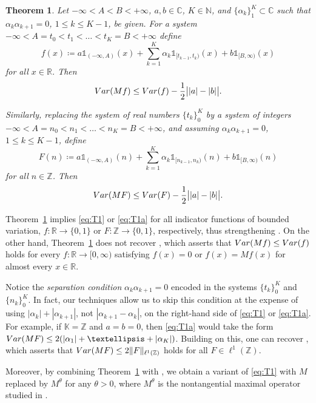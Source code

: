 \documentclass[leqno,11pt]{amsart}
\numberwithin{equation}{section}
\newtheorem{theorem}{Theorem}
\numberwithin{theorem}{section}
\newcommand{\KK}{\mathbb{K}}
\newcommand{\RR}{\mathbb{R}}
\newcommand{\ZZ}{\mathbb{Z}}
\newcommand{\CC}{\mathbb{C}}
\newcommand{\NN}{\mathbb{N}}
\newcommand{\Var}{{\rm Var}}
\newcommand{\ind}[1]{{\mathds{1}_{{#1}}}}
\begin{document}
	\begin{theorem} \label{T1}
		Let  $-\infty<A<B < +\infty$, $a,b\in\CC$, $K \in \NN$, and $\{\alpha_k\}_1^K \subset\CC$ such that $\alpha_k \alpha_{k+1} = 0$, $1\le k\le K-1$, be given.
		For a system $-\infty<A=t_0<t_1<\dots <t_K=B < +\infty$
		define
		\[
		f(x) \coloneqq a \ind{(-\infty,A)}(x) + \sum_{k=1}^K \alpha_k \ind{[t_{k-1},t_k)}(x) + b \ind{[B,\infty)}(x)
		\]
		for all $x \in \RR$. Then 
		\begin{equation} \label{eq:T1}
		\Var (Mf) \leq \Var (f) - \frac12 \big||a|-|b|\big|.
		\end{equation} 
		
		Similarly, replacing the system of real numbers  $\{t_k\}_0^K$ by a system of integers $-\infty<A=n_0<n_1<\dots <n_K=B < +\infty$, and assuming $\alpha_k \alpha_{k+1} = 0$, $1\le k\le K-1$, define
		\[
		F(n) \coloneqq a \ind{(-\infty,A)}(n) + \sum_{k=1}^K \alpha_k \ind{[n_{k-1},n_k)}(n) + b \ind{[B,\infty)}(n)
		\]
		for all $n \in \ZZ$. 
		Then
		\begin{equation} \label{eq:T1a}
		\Var(MF) \leq \Var(F) -  \frac12 \big||a|-|b|\big|.
		\end{equation} 
	\end{theorem}
	
	Theorem~\ref{T1} implies \eqref{eq:T1} or \eqref{eq:T1a} for all indicator functions of bounded variation, $f \colon \RR \to \{0,1\}$ or $F \colon \ZZ \to \{0,1\}$, respectively, thus strengthening
	\cite[Theorems~1.1~and~1.3]{BW}.
	On the other hand, Theorem~\ref{T1} does not recover \cite[Theorem~1.2]{BW}, which asserts that $\Var (Mf) \leq \Var (f)$ holds for every $f \colon \RR \to [0,\infty)$ satisfying $f(x) = 0$ or $f(x)=Mf(x)$ for almost every $x \in \RR$.
	
	Notice the \emph{separation condition} $\alpha_k \alpha_{k+1} = 0$ encoded in the systems  
	$\{t_k\}_0^K$ and $\{n_k\}_0^K$.
	In fact, our techniques allow us to skip this condition at the expense of using $|\alpha_{k}| + |\alpha_{k+1}|$, not $|\alpha_{k+1}-\alpha_k|$, on the right-hand side of  \eqref{eq:T1} or \eqref{eq:T1a}. For example, if $\KK = \ZZ$ and $a=b=0$, then \eqref{eq:T1a} would take the form $\Var(MF) \leq 2(|\alpha_1| + \dots + |\alpha_K|)$. Building on this, one can recover \cite[Theorem~1.1]{M2017}, which asserts that $\Var(MF) \leq 2 \| F \|_{\ell^1(\ZZ)}$ holds for all $F \in \ell^1(\ZZ)$. 
	
	Moreover, by combining Theorem~\ref{T1} with \cite[Subsection~5.3]{R2019}, we obtain a variant of \eqref{eq:T1} with $M$ replaced by $M^{\theta}$ for any $\theta > 0$, where $M^\theta$ is the nontangential maximal operator studied in \cite{R2019}.
	
\end{document}
